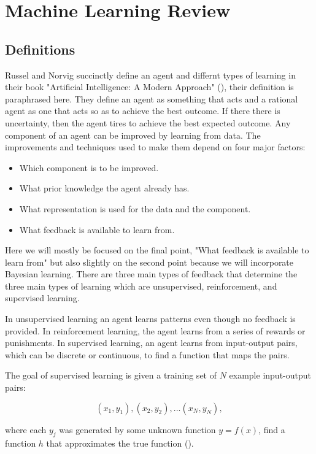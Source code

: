 \chapter{Machine Learning Review}



\section{Definitions}
Russel and Norvig succinctly define an agent and differnt types of learning in their book "Artificial Intelligence: A Modern Approach" (\cite{russell2009artificial}), their definition is paraphrased here. They define an agent as something that acts and a rational agent as one that acts so as to achieve the best outcome. If there there is uncertainty, then the agent tires to achieve the best expected outcome. Any component of an agent can be improved by learning from data. The improvements and techniques used to make them depend on four major factors:

\begin{itemize}
  \item Which component is to be improved.
  \item What prior knowledge the agent already has.
  \item What representation is used for the data and the component.
  \item What feedback is available to learn from.  
\end{itemize}

Here we will mostly be focused on the final point, "What feedback is available to learn from" but also slightly on the second point because we will incorporate Bayesian learning. There are three main types of feedback that determine the three main types of learning which are unsupervised, reinforcement, and supervised learning. 

In unsupervised learning an agent learns patterns even though no feedback is provided. In reinforcement learning, the agent learns from a series of rewards or punishments. In supervised learning, an agent learns from input-output pairs, which can be discrete or continuous, to find a function that maps the pairs. 

The goal of supervised learning is given a training set of $N$ example input-output pairs:

\[(x_1, y_1), (x_2,y_2),... (x_N,y_N),\]

where each $y_j$ was generated by some unknown function $y=f(x)$, find a function $h$ that approximates the true function
(\cite{russell2009artificial}).

